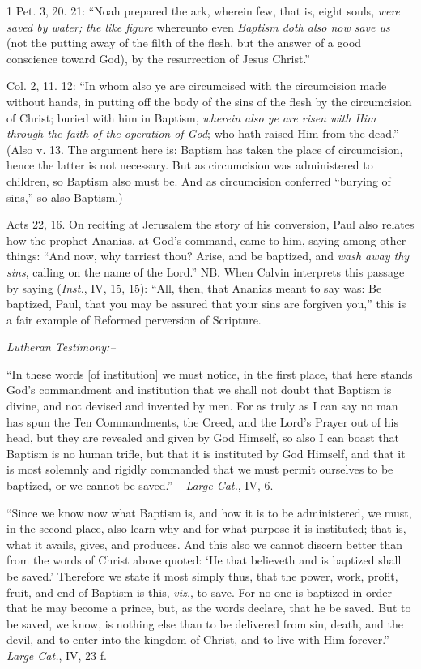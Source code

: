 \documentclass[
]{book}
\begin{document}
1 Pet. 3, 20. 21: ``Noah prepared the ark, wherein few, that is, eight souls, \emph{were saved by water; the like figure} whereunto even \emph{Baptism doth also now save us} (not the putting away of the filth of the flesh, but the answer of a good conscience toward God), by the resurrection of Jesus Christ.''

Col. 2, 11. 12: ``In whom also ye are circumcised with the circumcision made without hands, in putting off the body of the sins of the flesh by the circumcision of Christ; buried with him in Baptism, \emph{wherein also ye are risen with Him through the faith of the operation of God}; who hath raised Him from the dead.'' (Also v. 13. The argument here is: Baptism has taken the place of circumcision, hence the latter is not necessary. But as circumcision was administered to children, so Baptism also must be. And as circumcision conferred ``burying of sins,'' so also Baptism.)

Acts 22, 16. On reciting at Jerusalem the story of his conversion, Paul also relates how the prophet Ananias, at God's command, came to him, saying among other things: ``And now, why tarriest thou? Arise, and be baptized, and \emph{wash away thy sins}, calling on the name of the Lord.'' NB. When Calvin interprets this passage by saying (\emph{Inst.}, IV, 15, 15): ``All, then, that Ananias meant to say was: Be baptized, Paul, that you may be assured that your sins are forgiven you,'' this is a fair example of Reformed perversion of Scripture.

\begin{center}
\textsl{Lutheran Testimony:--}
\end{center}

``In these words {[}of institution{]} we must notice, in the first place, that here stands God's commandment and institution that we shall not doubt that Baptism is divine, and not devised and invented by men. For as truly as I can say no man has spun the Ten Commandments, the Creed, and the Lord's Prayer out of his head, but they are revealed and given by God Himself, so also I can boast that Baptism is no human trifle, but that it is instituted by God Himself, and that it is most solemnly and rigidly commanded that we must permit ourselves to be baptized, or we cannot be saved.'' -- \emph{Large Cat.}, IV, 6.

``Since we know now what Baptism is, and how it is to be administered, we must, in the second place, also learn why and for what purpose it is instituted; that is, what it avails, gives, and produces. And this also we cannot discern better than from the words of Christ above quoted: `He that believeth and is baptized shall be saved.' Therefore we state it most simply thus, that the power, work, profit, fruit, and end of Baptism is this, \emph{viz.}, to save. For no one is baptized in order that he may become a prince, but, as the words declare, that he be saved. But to be saved, we know, is nothing else than to be delivered from sin, death, and the devil, and to enter into the kingdom of Christ, and to live with Him forever.'' -- \emph{Large Cat.}, IV, 23 f.
\end{document}
